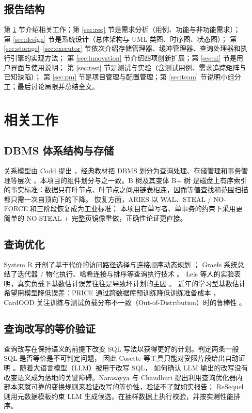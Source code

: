 \documentclass[a4paper,zihao=-4,UTF8,fontset=windows,linespread=1.35]{ctexart}
\begin{document}
\subsection{报告结构}
第 \ref{sec:related} 节介绍相关工作；第 \ref{sec:req} 节是需求分析（用例、功能与非功能需求）；
第 \ref{sec:design} 节是系统设计（总体架构与 UML 类图、时序图、状态图）；
第 \ref{sec:storage}--\ref{sec:executor} 节依次介绍存储管理器、缓冲管理器、查询处理器和执行引擎的实现方法；
第 \ref{sec:innovation} 节介绍四项创新扩展；第 \ref{sec:ui} 节是用户界面与使用说明；
第 \ref{sec:test} 节是测试与实验（含测试用例、需求追踪矩阵与已知缺陷）；
第 \ref{sec:pm} 节是项目管理与配置管理；第 \ref{sec:team} 节说明小组分工；最后讨论局限并总结全文。

\section{相关工作}\label{sec:related}

\subsection{DBMS 体系结构与存储}
关系模型由 Codd 提出 \cite{codd1970}，经典教材把 DBMS 划分为查询处理、存储管理和事务管理等层次
\cite{silberschatz2019,gmuw2008}，本项目的组件划分与之一致。B 树及其变体 B+ 树 \cite{bayer1972,comer1979}
是磁盘上有序索引的事实标准：数据只在叶节点、叶节点之间用链表相连，因而等值查找和范围扫描都只需一次自顶向下的下降。
恢复方面，ARIES \cite{mohan1992} 以 WAL、STEAL / NO-FORCE 和三阶段恢复成为工业标准；
本项目在单写者、单事务的约束下采用更简单的 NO-STEAL + 完整页镜像重做，正确性论证更直接。

\subsection{查询优化}
System R 开创了基于代价的访问路径选择与连接顺序动态规划 \cite{selinger1979}；
Graefe 系统总结了迭代器 / 物化执行、哈希连接与排序等查询执行技术 \cite{graefe1993}。
Leis 等人的实验表明，真实负载下基数估计误差往往是导致坏计划的主因 \cite{leis2015}。
近年的学习型基数估计希望用模型降低误差：PRICE 通过跨数据库预训练降低训练准备成本 \cite{price2024}，
CardOOD 关注训练与测试负载分布不一致（Out-of-Distribution）时的鲁棒性 \cite{cardood2026}。

\subsection{查询改写的等价验证}
查询改写在保持语义的前提下改变 SQL 写法以获得更好的计划。判定两条一般 SQL 是否等价是不可判定问题，
因此 Cosette 等工具只能对受限片段给出自动证明 \cite{chu2017}。随着大语言模型（LLM）被用于改写 SQL，
如何确认 LLM 输出的改写没有改变语义成为落地的关键障碍。Narasayya 与 Chaudhuri \cite{narasayya2026}
提出利用查询优化器内部本来就可靠的变换规则来验证改写的等价性，验证不了就如实报告；
ReSequel \cite{resequel2026} 则用元数据模板约束 LLM 生成候选，在抽样数据上执行校验，并按实测性能排序。
\end{document}
